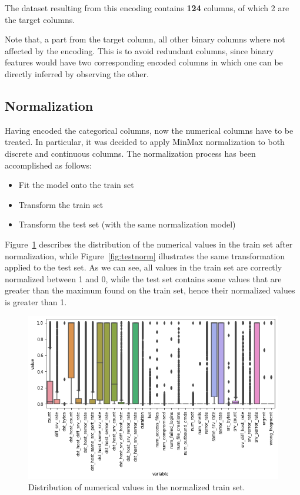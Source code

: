 The dataset resulting from this encoding contains \textbf{124} columns, of which 2 are the target columns.

Note that, a part from the target column, all other binary columns where not affected by the encoding. This is to avoid redundant columns, since binary features would have two corresponding encoded columns in which one can be directly inferred by observing the other.

\subsection{Normalization}
\label{subsec:norm}

Having encoded the categorical columns, now the numerical columns have to be treated. In particular, it was decided to apply MinMax \cite{minmax} normalization to both discrete and continuous columns. The normalization process has been accomplished as follows: 

\begin{itemize}
    \item Fit the model onto the train set
    \item Transform the train set
    \item Transform the test set (with the same normalization model)
\end{itemize}

Figure~\ref{fig:trainnorm} describes the distribution of the numerical values in the train set after normalization, while Figure~\ref{fig:testnorm} illustrates the same transformation applied to the test set. As we can see, all values in the train set are correctly normalized between 1 and 0, while the test set contains some values that are greater than the maximum found on the train set, hence their normalized values is greater than 1.


\begin{figure}[h]
    \centering
    \includegraphics[width=\linewidth]{img/box_train.png}
    \caption{Distribution of numerical values in the normalized train set.}
    \label{fig:trainnorm}
\end{figure}


